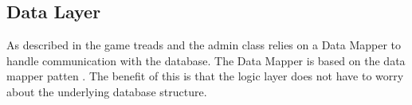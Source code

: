 





\subsection{Data Layer}
As described in  the game treads and the admin class relies on a Data Mapper to handle communication with the database. The Data Mapper is based on the data mapper patten . The benefit of this is that the logic layer does not have to worry about the underlying database structure.

